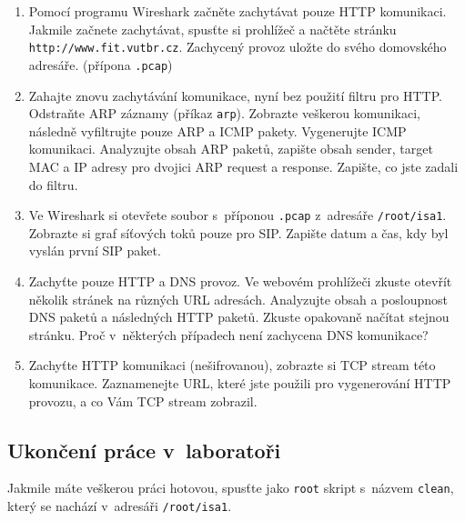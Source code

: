 \begin{enumerate}
\item Pomocí programu Wireshark začněte zachytávat pouze HTTP komunikaci. Jakmile začnete zachytávat, spusťte si prohlížeč a načtěte stránku \texttt{http://www.fit.vutbr.cz}. Zachycený provoz uložte do svého domovského adresáře. (přípona \texttt{.pcap})
\item Zahajte znovu zachytávání komunikace, nyní bez použití filtru pro HTTP. Odstraňte ARP záznamy (příkaz \texttt{arp}). Zobrazte veškerou komunikaci, následně vyfiltrujte pouze ARP a ICMP pakety. Vygenerujte ICMP komunikaci. Analyzujte obsah ARP paketů, zapište obsah sender, target MAC a IP adresy pro dvojici ARP request a response. Zapište, co jste zadali do filtru.
\item Ve Wireshark si otevřete soubor s~příponou \texttt{.pcap} z~adresáře \texttt{/root/isa1}. Zobrazte si graf síťových toků pouze pro SIP. Zapište datum a čas, kdy byl vyslán první SIP paket.
\item Zachyťte pouze HTTP a DNS provoz. Ve webovém prohlížeči zkuste otevřít několik stránek na různých URL adresách. Analyzujte obsah a posloupnost DNS paketů a následných HTTP paketů. Zkuste opakovaně načítat stejnou stránku. Proč v~některých případech není zachycena DNS komunikace?
\item Zachyťte HTTP komunikaci (nešifrovanou), zobrazte si TCP stream této komunikace. Zaznamenejte URL, které jste použili pro vygenerování HTTP provozu, a co Vám TCP stream zobrazil.
\end{enumerate}

\subsection{Ukončení práce v~laboratoři}
Jakmile máte veškerou práci hotovou, spusťte jako \texttt{root} skript s~názvem \texttt{clean}, který se nachází v~adresáři \texttt{/root/isa1}.
